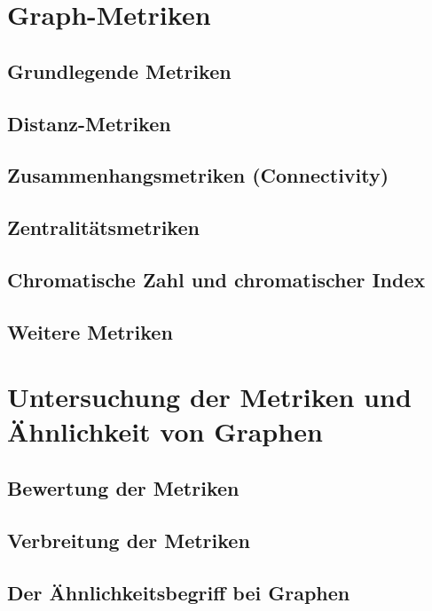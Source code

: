 \documentclass[a4paper,12pt,ngerman,chapterprefix=false,listof=totoc,bibliography=totoc]{scrreprt}
\begin{document}
\chapter{Graph-Metriken}

\section{Grundlegende Metriken}

\section{Distanz-Metriken}

\section{Zusammenhangsmetriken (Connectivity)}

\section{Zentralitätsmetriken}

\section{Chromatische Zahl und chromatischer Index}

\section{Weitere Metriken}

\chapter{Untersuchung der Metriken und Ähnlichkeit von Graphen}

\section{Bewertung der Metriken}

\section{Verbreitung der Metriken}

\section{Der Ähnlichkeitsbegriff bei Graphen}
\end{document}
